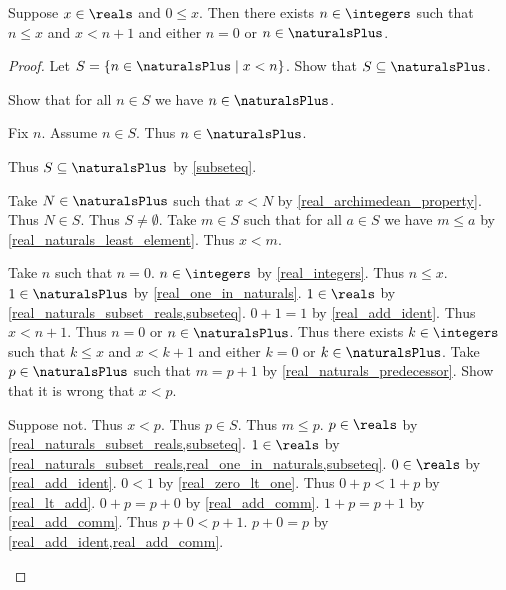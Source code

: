 \begin{lemma}\label{real_consecutive_integers_nonneg}
    Suppose $x\in\reals$ and $0 \leq x$.
    Then there exists $n\in\integers$ such that $n \leq x$ and $x < n + 1$ and either $n = 0$ or $n\in\naturalsPlus$.
\end{lemma}
\begin{proof}
    Let $S = \{ n\in\naturalsPlus \mid x < n\}$.
    Show that $S\subseteq\naturalsPlus$.
    \begin{subproof}
        Show that for all $n\in S$ we have $n\in\naturalsPlus$.
        \begin{subproof}
            Fix $n$.
            Assume $n\in S$.
            Thus $n\in\naturalsPlus$.
        \end{subproof}
        Thus $S\subseteq\naturalsPlus$ by \cref{subseteq}.
    \end{subproof}
    Take $N\in\naturalsPlus$ such that $x < N$ by \cref{real_archimedean_property}.
    Thus $N\in S$.
    Thus $S\neq \emptyset$.
    Take $m\in S$ such that for all $a\in S$ we have $m \leq a$ by \cref{real_naturals_least_element}.
    Thus $x < m$.
    \begin{byCase}
        Take $n$ such that $n = 0$.
        $n\in\integers$ by \cref{real_integers}.
        Thus $n \leq x$.
        $1\in\naturalsPlus$ by \cref{real_one_in_naturals}.
        $1\in\reals$ by \cref{real_naturals_subset_reals,subseteq}.
        $0 + 1 = 1$ by \cref{real_add_ident}.
        Thus $x < n + 1$.
        Thus $n = 0$ or $n\in\naturalsPlus$.
        Thus there exists $k\in\integers$ such that $k \leq x$ and $x < k + 1$ and either $k = 0$ or $k\in\naturalsPlus$.
        Take $p\in\naturalsPlus$ such that $m = p + 1$ by \cref{real_naturals_predecessor}.
        Show that it is wrong that $x < p$.
        \begin{subproof}
            Suppose not.
            Thus $x < p$.
            Thus $p\in S$.
            Thus $m \leq p$.
            $p\in\reals$ by \cref{real_naturals_subset_reals,subseteq}.
            $1\in\reals$ by \cref{real_naturals_subset_reals,real_one_in_naturals,subseteq}.
            $0\in\reals$ by \cref{real_add_ident}.
            $0 < 1$ by \cref{real_zero_lt_one}.
            Thus $0 + p < 1 + p$ by \cref{real_lt_add}.
            $0 + p = p + 0$ by \cref{real_add_comm}.
            $1 + p = p + 1$ by \cref{real_add_comm}.
            Thus $p + 0 < p + 1$.
            $p + 0 = p$ by \cref{real_add_ident,real_add_comm}.

\end{subproof}
\end{byCase}
\end{proof}
